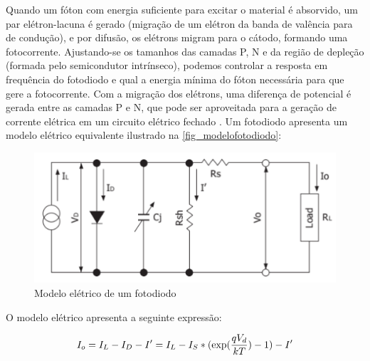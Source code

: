 Quando um fóton com energia suficiente para excitar o material \'e absorvido, um par el\'etron-lacuna \'e gerado (migração de um el\'etron da banda de valência para de condução), e por difusão, os el\'etrons migram para o cátodo, formando uma fotocorrente. Ajustando-se os tamanhos das camadas P, N e da região de depleção (formada pelo semicondutor intrínseco), podemos controlar a resposta em frequência do fotodiodo e qual a energia mínima do fóton necessária para que gere a fotocorrente. Com a migração dos el\'etrons, uma diferença de potencial \'e gerada entre as camadas P e N, que pode ser aproveitada para a geração de corrente el\'etrica em um circuito el\'etrico fechado \cite{hamamatsu}.
Um fotodiodo apresenta um modelo el\'etrico equivalente ilustrado na \autoref{fig_modelofotodiodo}:

\begin{figure}[htb]
	\caption{\label{fig_modelofotodiodo}Modelo el\'etrico de um fotodiodo}
	\begin{center}
	    \includegraphics[scale=0.8]{Imagens/ModeloFotodiodo.png}
	\end{center}
\end{figure}

    O modelo el\'etrico apresenta a seguinte express\~ao:

\begin{equation}
    \label{eq_modEletFot}
    I_o = I_L - I_D - I\rq = I_L - I_S*(\exp (\frac{qV_d}{kT})-1) - I\rq
\end{equation}

